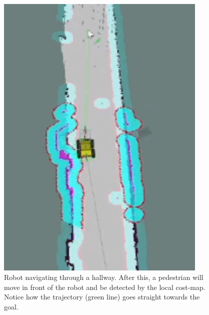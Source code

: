 \begin{figure}[ht]
  \centering
  \begin{minipage}[b]{0.49\textwidth}
        \centering
        \includegraphics[width = 0.9\textwidth]{Figures/figuiaCollisionAvoid3.png}
        \caption{Robot navigating through a hallway. After this, a pedestrian will move in front of the robot and be detected by the local cost-map. Notice how the trajectory (green line) goes straight towards the goal.}
        \label{fig:R&D:H:CA:CollisionAvoidance1}
  \end{minipage}
  \hfill
  \begin{minipage}[b]{0.49\textwidth}
    \centering

\end{minipage}
\end{figure}
